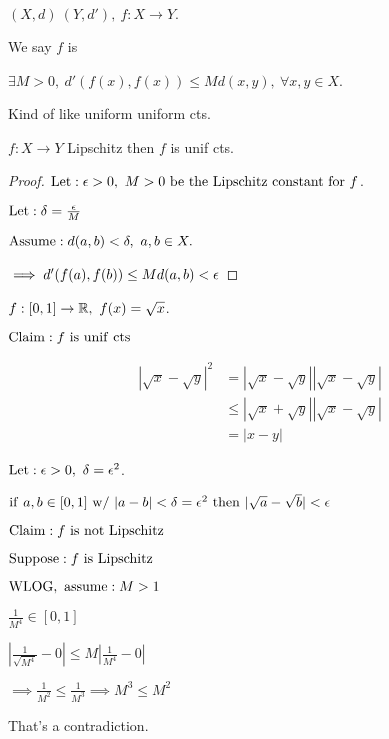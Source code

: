 \documentclass[12pt]{article}
\begin{document}
\bboxdefn
\begin{defn}[Lipschitz]
    \((X,d)\ (Y,d'),\ f:X\to Y.\)

    We say \(f\) is  

    \(\exists M>0,\ d'(f(x),f(x))\le Md(x,y),\ \forall x,y\in X\).
\end{defn}
\ebox

Kind of like uniform uniform cts.

\bboxprop
\begin{prop}
    \(f:X\to Y\) Lipschitz then \(f\) is unif cts.
\end{prop}
\ebox

\bboxproof
\begin{proof}
    \(\llet:\e>0,\ M>0\ \TR{be\ the\ Lipschitz\ constant\ for}\ f\).

    \(\mathrm{Let}:\delta=\frac{\epsilon} M\)

    \(\mathrm{Assume}:d(a,b)<\delta,\ a,b\in X.\)

    \(\implies d'(f(a),f(b))\le Md(a,b)<\epsilon\)
\end{proof}
\ebox

\bboxexam
\begin{exam}
    \(f:[0,1]\to\mathbb R,\ f(x)=\sqrt x\).

    \(\TR{Claim}:f\ \is\ \TR{unif\ cts}\)
    \bboxnote
    \begin{note}
        \begin{align*}
            |\sqrt x - \sqrt y|^2 &= |\sqrt x - \sqrt y||\sqrt x - \sqrt y|\\
                                  &\le|\sqrt x+\sqrt y||\sqrt x-\sqrt y|\\
                                  &=|x-y|
        \end{align*}
    \end{note}
    \ebox
    \(\mathrm{Let}:\epsilon>0,\ \delta=\epsilon^2\).

    \(\iif\ a,b\in[0,1]\ \TR{w/}\ 
    |a-b|<\delta=\epsilon^2\
    \tthen\ |\sqrt a-\sqrt b|<\e\)
\end{exam}
\ebox

\bboxexam
\begin{exam}
    \(\TR{Claim}:f\ \is\ \TR{not\ Lipschitz}\)

    \(\TR{Suppose}:f\ \is\ \TR{Lipschitz}\)

    \(\mathrm{WLOG,\ assume}:M>1\)

    \(\frac1{M^4}\in[0,1]\)

    \(\left|\frac1{\sqrt{M^4}}-0\right|\le M\left|\frac1{M^4}-0\right|\)

    \(\implies\frac1{M^2}\le\frac1{M^3}\implies M^3\le M^2\)

    That's a contradiction.
\end{exam}
\ebox


\end{document}
